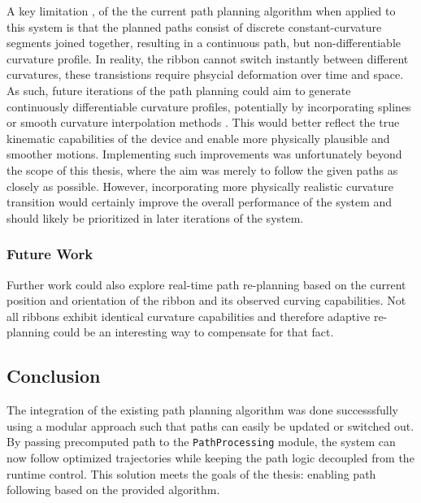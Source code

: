A key limitation , of the the current path planning algorithm when applied to this system is that the planned paths consist of discrete constant-curvature segments joined together, resulting in a continuous path, but non-differentiable curvature profile. In reality, the ribbon cannot switch instantly between different curvatures, these transistions require phsycial deformation over time and space. 
As such, future iterations of the path planning could aim to generate continuously differentiable curvature profiles, potentially by incorporating splines or smooth curvature interpolation methods \cite{fossen_handbook_2011}. This would better reflect the true kinematic capabilities of the device and enable more physically plausible and smoother motions.
\newline \newline
Implementing such improvements was unfortunately beyond the scope of this thesis, where the aim was merely to follow the given paths as closely as possible. However, incorporating more physically realistic curvature transition would certainly improve the overall performance of the system and should likely be prioritized in later iterations of the system.

\subsubsection{Future Work}
Further work could also explore real-time path re-planning based on the current position and orientation of the ribbon and its observed curving capabilities. Not all ribbons exhibit identical curvature capabilities and therefore adaptive re-planning could be an interesting way to compensate for that fact.

\subsection{Conclusion}
The integration of the existing path planning algorithm was done successsfully using a modular approach such that paths can easily be updated or switched out. By passing precomputed path to the \texttt{PathProcessing} module, the system can now follow optimized trajectories while keeping the path logic decoupled from the runtime control. This solution meets the goals of the thesis: enabling path following based on the provided algorithm.



